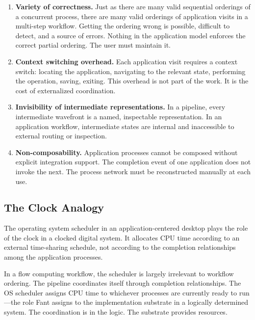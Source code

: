 \documentclass[12pt, a4paper]{article}
\begin{document}
\begin{enumerate}
\item \textbf{Variety of correctness.} Just as there are many valid
  sequential orderings of a concurrent process, there are many valid
  orderings of application visits in a multi-step workflow. Getting
  the ordering wrong is possible, difficult to detect, and a source
  of errors. Nothing in the application model enforces the correct
  partial ordering. The user must maintain it.

\item \textbf{Context switching overhead.} Each application visit
  requires a context switch: locating the application, navigating to
  the relevant state, performing the operation, saving, exiting. This
  overhead is not part of the work. It is the cost of externalized
  coordination.

\item \textbf{Invisibility of intermediate representations.} In a
  pipeline, every intermediate wavefront is a named, inspectable
  representation. In an application workflow, intermediate states
  are internal and inaccessible to external routing or inspection.

\item \textbf{Non-composability.} Application processes cannot be
  composed without explicit integration support. The completion event
  of one application does not invoke the next. The process network
  must be reconstructed manually at each use.
\end{enumerate}

\subsection{The Clock Analogy}

The operating system scheduler in an application-centered desktop
plays the role of the clock in a clocked digital system. It allocates
CPU time according to an external time-sharing schedule, not according
to the completion relationships among the application processes.

In a flow computing workflow, the scheduler is largely irrelevant to
workflow ordering. The pipeline coordinates itself through completion
relationships. The OS scheduler assigns CPU time to whichever
processes are currently ready to run---the role Fant assigns to the
implementation substrate in a logically determined system. The
coordination is in the logic. The substrate provides resources.
\end{document}
